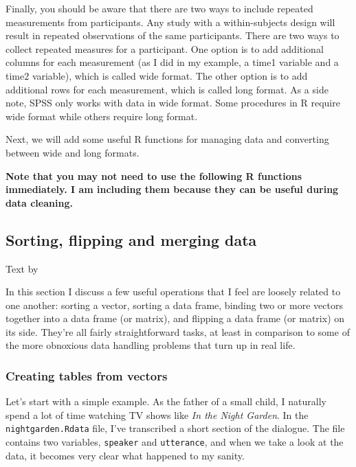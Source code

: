\documentclass[
]{book}
\begin{document}
Finally, you should be aware that there are two ways to include repeated measurements from participants. Any study with a within-subjects design will result in repeated observations of the same participants. There are two ways to collect repeated measures for a participant. One option is to add additional columns for each measurement (as I did in my example, a time1 variable and a time2 variable), which is called wide format. The other option is to add additional rows for each measurement, which is called long format. As a side note, SPSS only works with data in wide format. Some procedures in R require wide format while others require long format.

Next, we will add some useful R functions for managing data and converting between wide and long formats.

\textbf{Note that you may not need to use the following R functions immediately. I am including them because they can be useful during data cleaning.}

\hypertarget{sort}{%
\subsection{Sorting, flipping and merging data}\label{sort}}

Text by \citet{Navarro2018}

In this section I discuss a few useful operations that I feel are loosely related to one another: sorting a vector, sorting a data frame, binding two or more vectors together into a data frame (or matrix), and flipping a data frame (or matrix) on its side. They're all fairly straightforward tasks, at least in comparison to some of the more obnoxious data handling problems that turn up in real life.

\hypertarget{creating-tables-from-vectors}{%
\subsubsection{Creating tables from vectors}\label{creating-tables-from-vectors}}

Let's start with a simple example. As the father of a small child, I naturally spend a lot of time watching TV shows like \emph{In the Night Garden}. In the \texttt{nightgarden.Rdata} file, I've transcribed a short section of the dialogue. The file contains two variables, \texttt{speaker} and \texttt{utterance}, and when we take a look at the data, it becomes very clear what happened to my sanity.
\end{document}
